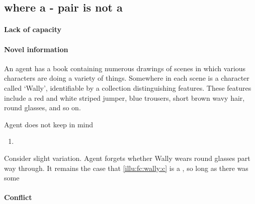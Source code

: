 \subsection{ where a - pair is not a \fc{}}

\paragraph*{Lack of capacity}



\paragraph*{Novel information}

\begin{note}
  \begin{scenario}
    \label{illu:fc:wally}
    An agent has a book containing numerous drawings of scenes in which various characters are doing a variety of things.
    Somewhere in each scene is a character called `Wally', identifiable by a collection distinguishing features.
    These features include a red and white striped jumper, blue trousers, short brown wavy hair, round glasses, and so on.
  \end{scenario}

  Agent does not keep in mind 

  \begin{enumerate}[label=C\thescenarioCounter., ref=(C\thescenarioCounter)]
  \item
    \label{illu:fc:wally:c}
  \end{enumerate}

  Consider slight variation.
  Agent forgets whether Wally wears round glasses part way through.
  It remains the case that \autoref{illu:fc:wally:c} is a \fc{}, so long as there was some 
\end{note}

\paragraph*{Conflict}


